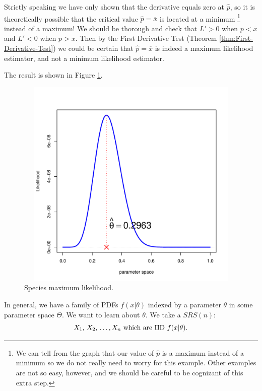 \documentclass[captions=tableheading]{scrbook}
\begin{document}
\begin{example}
\begin{rem}
Strictly speaking we have only shown that the derivative equals zero at \(\hat{p}\), so it is theoretically possible that the critical value \(\hat{p}=\overline{x}\) is located at a minimum
\footnote{We can tell from the graph that our value of \(\hat{p}\) is a maximum instead of a minimum so we do not really need to worry for this example. Other examples are not so easy, however, and we should be careful to be cognizant of this extra step.}
instead of a maximum! We should be thorough and check that \(L'>0\) when \(p<\overline{x}\) and \(L'<0\) when \(p>\overline{x}\). Then by the First Derivative Test (Theorem \ref{thm:First-Derivative-Test}) we could be certain that \(\hat{p}=\overline{x}\) is indeed a maximum likelihood estimator, and not a minimum likelihood estimator.
\end{rem}

The result is shown in Figure \ref{fig:species-mle}.
\end{example}






\begin{figure}[th]
    \includegraphics[width=5in, height=4in]{img/species-mle.pdf}
    \caption[Species maximum likelihood]{\small Species maximum likelihood.}
    \label{fig:species-mle}
  \end{figure}

In general, we have a family of PDFs \(f(x|\theta)\) indexed by a parameter \(\theta\) in some parameter space \(\Theta\). We want to learn about \(\theta\). We take a \(SRS(n)\):
\begin{equation}
X_{1},\, X_{2},\,\ldots,X_{n}\mbox{ which are IID \( f(x| \theta ) \).}
\end{equation}
\end{document}
